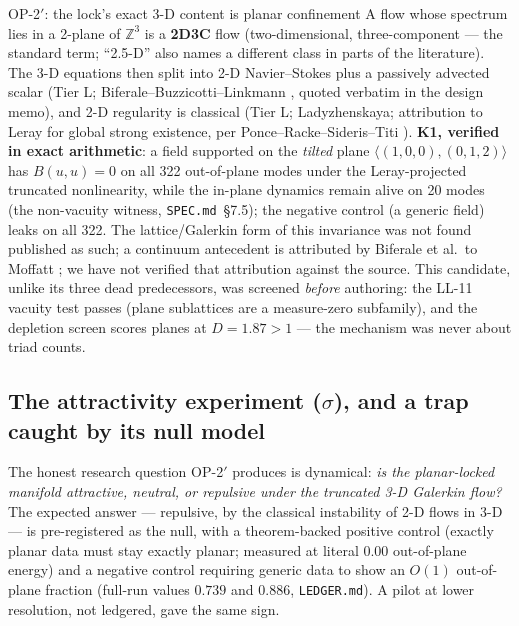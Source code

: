 \documentclass[11pt,a4paper]{article}
\newcommand{\tL}{\textsf{Tier L}}
\newcommand{\Z}{\mathbb{Z}}
\theoremstyle{definition}
\theoremstyle{plain}
\begin{document}
\begin{keybox}{OP-2$'$: the lock's exact 3-D content is planar confinement}
A flow whose spectrum lies in a 2-plane of $\Z^3$ is a \textbf{2D3C} flow (two-dimensional,
three-component --- the standard term; ``2.5-D'' also names a different class in parts of the
literature). The 3-D equations then split into 2-D Navier--Stokes plus a passively advected
scalar (\tL{}; Biferale--Buzzicotti--Linkmann \cite{biferale-buzzicotti-linkmann}, quoted
verbatim in the design memo), and 2-D regularity is classical (\tL{}; Ladyzhenskaya;
attribution to Leray for global strong existence, per Ponce--Racke--Sideris--Titi
\cite{ponce-racke-sideris-titi}). \textbf{K1, verified in exact arithmetic}: a field
supported on the \emph{tilted} plane $\langle(1,0,0),(0,1,2)\rangle$ has $B(u,u)=0$ on all 322
out-of-plane modes under the Leray-projected truncated nonlinearity, while the in-plane
dynamics remain alive on 20 modes (the non-vacuity witness, \texttt{SPEC.md}~\S7.5); the
negative control (a generic field) leaks on all 322. The lattice/Galerkin form of this
invariance was not found published as such; a continuum antecedent is attributed by Biferale
et al.\ to Moffatt \cite{moffatt2014}; we have not verified that attribution against the
source. This candidate, unlike its
three dead predecessors, was screened \emph{before} authoring: the LL-11 vacuity test passes
(plane sublattices are a measure-zero subfamily), and the depletion screen scores planes at
$D=1.87>1$ --- the mechanism was never about triad counts.
\end{keybox}

\subsection{The attractivity experiment ($\sigma$), and a trap caught by its null model}

The honest research question OP-2$'$ produces is dynamical: \emph{is the planar-locked
manifold attractive, neutral, or repulsive under the truncated 3-D Galerkin flow?} The
expected answer --- repulsive, by the classical instability of 2-D flows in 3-D --- is
pre-registered as the null, with a theorem-backed positive control (exactly planar data must
stay exactly planar; measured at literal $0.00$ out-of-plane energy) and a negative control
requiring generic data to show an $O(1)$ out-of-plane fraction (full-run values $0.739$ and
$0.886$, \texttt{LEDGER.md}). A pilot at lower resolution, not ledgered, gave the same sign.
\end{document}
